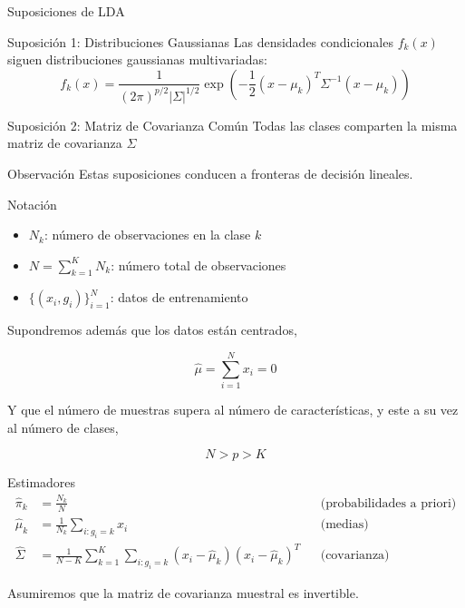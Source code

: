 \documentclass[spanish]{beamer}
\begin{document}
\begin{frame}{Suposiciones de LDA}
\begin{block}{Suposición 1: Distribuciones Gaussianas}
Las densidades condicionales $f_k(x)$ siguen distribuciones gaussianas multivariadas:
\[
f_k(x) = \frac{1}{(2\pi)^{p/2} |\Sigma|^{1/2}} \exp\left(-\frac{1}{2}(x - \mu_k)^T \Sigma^{-1} (x - \mu_k)\right)
\]
\end{block}

\begin{block}{Suposición 2: Matriz de Covarianza Común}
Todas las clases comparten la misma matriz de covarianza $\Sigma$
\end{block}

\begin{alertblock}{Observación}
Estas suposiciones conducen a fronteras de decisión lineales.
\end{alertblock}
\end{frame}

\begin{frame}{Notación}
\begin{itemize}
    \item $N_k$: número de observaciones en la clase $k$
    \item $N = \sum_{k=1}^K N_k$: número total de observaciones
    \item $\{(x_i, g_i)\}_{i=1}^N$: datos de entrenamiento
\end{itemize}

Supondremos además que los datos están centrados,

\[
\hat{\mu} = \sum_{i=1}^N x_i = 0
\]

Y que el número de muestras supera al número de características, y este a su vez al número de clases,

\[
N > p > K
\]

\end{frame}

\begin{frame}{Estimadores}
\begin{align*}
\hat{\pi}_k &= \frac{N_k}{N} && \text{(probabilidades a priori)} \\
\hat{\mu}_k &= \frac{1}{N_k} \sum_{i: g_i = k} x_i && \text{(medias)} \\
\hat{\Sigma} &= \frac{1}{N - K} \sum_{k=1}^K \sum_{i: g_i = k} (x_i - \hat{\mu}_k)(x_i - \hat{\mu}_k)^T && \text{(covarianza)}
\end{align*}

Asumiremos que la matriz de covarianza muestral es invertible.
\end{frame}
\end{document}
